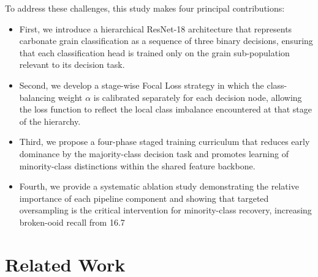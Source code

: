 \documentclass[a4paper,fleqn]{cas-dc}
\begin{document}
To address these challenges, this study makes four principal contributions:
\begin{itemize}
\item First, we introduce a hierarchical ResNet-18 architecture that represents carbonate grain classification as a sequence of three binary decisions, ensuring that each classification head is trained only on the grain sub-population relevant to its decision task.
\item Second, we develop a stage-wise Focal Loss strategy in which the class-balancing weight $\alpha$ is calibrated separately for each decision node, allowing the loss function to reflect the local class imbalance encountered at that stage of the hierarchy.
\item Third, we propose a four-phase staged training curriculum that reduces early dominance by the majority-class decision task and promotes learning of minority-class distinctions within the shared feature backbone.
\item Fourth, we provide a systematic ablation study demonstrating the relative importance of each pipeline component and showing that targeted oversampling is the critical intervention for minority-class recovery, increasing broken-ooid recall from 16.7%
\end{itemize}
\section{Related Work}
\end{document}
